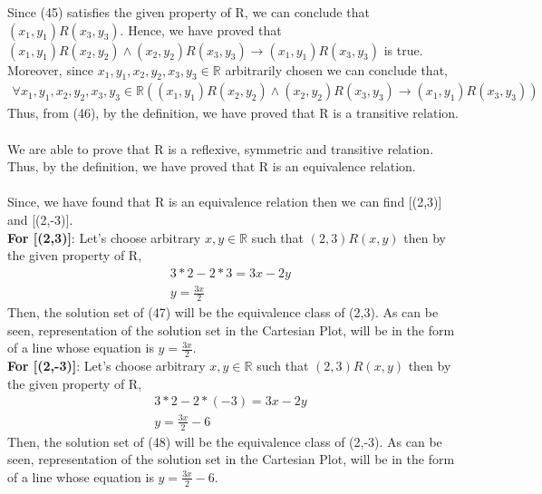 \documentclass[12pt]{article}
\newcommand{\R}{\mathbb{R}}
\begin{document}
Since (45) satisfies the given property of R, we can conclude that $(x_{1},y_{1})R(x_{3},y_{3})$. Hence, we have proved that $(x_{1},y_{1})R(x_{2},y_{2})\land(x_{2},y_{2})R(x_{3},y_{3})\rightarrow (x_{1},y_{1})R(x_{3},y_{3})$ is true. Moreover, since $ x_{1},y_{1},x_{2},y_{2},x_{3},y_{3}\in \R$ arbitrarily chosen we can conclude that,
\begin{equation}
\begin{split}
\forall x_{1},y_{1},x_{2},y_{2},x_{3},y_{3}\in \R((x_{1},y_{1})R(x_{2},y_{2})\land(x_{2},y_{2})R(x_{3},y_{3})\rightarrow (x_{1},y_{1})R(x_{3},y_{3}))
\end{split}
\end{equation}
Thus, from (46), by the definition, we have proved that R is a transitive relation.\\ \\
We are able to prove that R is a reflexive, symmetric and transitive relation. Thus, by the definition, we have proved that R is an equivalence relation.\\ \\
Since, we have found that R is an equivalence relation then we can find [(2,3)] and [(2,-3)].\\
\textbf{For [(2,3)]}: Let's choose arbitrary $x,y \in \R$ such that $(2,3)R(x,y)$ then by the given property of R,
\begin{equation}
\begin{split}
3*2 -2*3 = 3x - 2y & \\
y = \frac{3x}{2}  \qquad
\end{split}
\end{equation}
Then, the solution set of (47) will be the equivalence class of (2,3). As can be seen, representation of the solution set in the Cartesian Plot, will be in the form of a line whose equation is $y = \frac{3x}{2}$.\\
\textbf{For [(2,-3)]}: Let's choose arbitrary $x,y \in \R$ such that $(2,3)R(x,y)$ then by the given property of R,
\begin{equation}
\begin{split}
3*2 -2*(-3) = 3x - 2y & \\
y = \frac{3x}{2}-6  \qquad
\end{split}
\end{equation}
Then, the solution set of (48) will be the equivalence class of (2,-3). As can be seen, representation of the solution set in the Cartesian Plot, will be in the form of a line whose equation is $y = \frac{3x}{2}-6$.

\begin{figure}[h]
	\centering
\end{figure}
\end{document}

